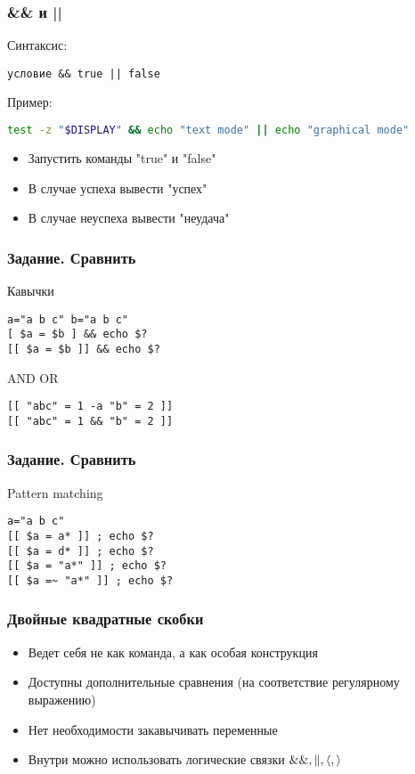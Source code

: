 \begin{frame}[fragile]
\frametitle{\&\& и ||}
	Синтаксис:
\begin{verbatim}
условие && true || false
\end{verbatim}

	\pause
	Пример:
\begin{lstlisting}[language=bash]
test -z "$DISPLAY" && echo "text mode" || echo "graphical mode"
\end{lstlisting}
	
	\pause

	\begin{itemize}
	    \item Запустить команды "true" и "false"
	    \item В случае успеха вывести "успех"
	    \item В случае неуспеха вывести "неудача"
	\end{itemize}
\end{frame}

\begin{frame}[fragile]
    \frametitle{ Задание. Сравнить }
    \begin{block}{Кавычки}
	\small\begin{lstlisting}
a="a b c" b="a b c"
[ $a = $b ] && echo $?
[[ $a = $b ]] && echo $?
	\end{lstlisting}
    \end{block}

    \begin{block}{ AND OR}
	\small\begin{lstlisting}
[[ "abc" = 1 -a "b" = 2 ]]
[[ "abc" = 1 && "b" = 2 ]]
	\end{lstlisting}
    \end{block}
\end{frame}

\begin{frame}[fragile]
    \frametitle{ Задание. Сравнить }
    \begin{block}{ Pattern matching}
	\small\begin{lstlisting}
a="a b c"
[[ $a = a* ]] ; echo $?
[[ $a = d* ]] ; echo $?
[[ $a = "a*" ]] ; echo $?
[[ $a =~ "a*" ]] ; echo $?
	\end{lstlisting}
    \end{block}
\end{frame}

\begin{frame}[fragile]
	\frametitle{Двойные квадратные скобки}

	\begin{itemize}
		\item Ведет себя не как команда, а как особая конструкция
		\item Доступны дополнительные сравнения (на соответствие регулярному выражению)
		\item Нет необходимости закавычивать переменные
		\item Внутри можно использовать логические связки \({\tt \&\&, \|, \langle, \rangle}\)
	\end{itemize}
\end{frame}

